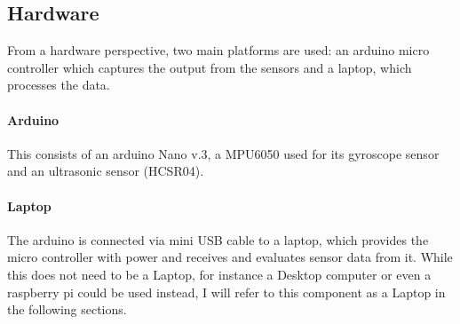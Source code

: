 \subsection{Hardware}
\label{subsec:hardware}

From a hardware perspective, two main platforms are used: an arduino micro controller which captures the output from the sensors and a laptop, which processes the data.

\paragraph{Arduino}
This consists of an arduino Nano v.3, a MPU6050 used for its gyroscope sensor and an ultrasonic sensor (HCSR04).

\paragraph{Laptop}
The arduino is connected via mini USB cable to a laptop, which provides the micro controller with power and receives and evaluates sensor data from it.
While this does not need to be a Laptop, for instance a Desktop computer or even a raspberry pi could be used instead, I will refer to this component as a Laptop in the following sections.
